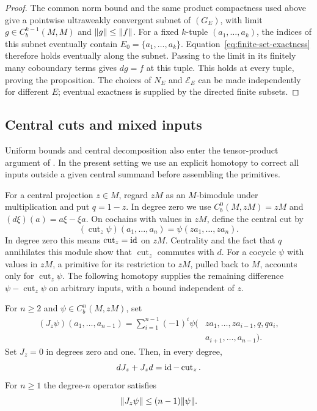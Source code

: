 \begin{proof}
The common norm bound and the same product compactness used above
give a pointwise ultraweakly convergent subnet of $(G_E)$, with limit
$g\in C_b^{k-1}(M,M)$ and $\lVert g\rVert\le\lVert f\rVert$.  For a fixed
$k$-tuple $(a_1,\ldots,a_k)$, the indices of this subnet eventually
contain $E_0=\{a_1,\ldots,a_k\}$.  Equation~\eqref{eq:finite-set-exactness}
therefore holds eventually along the subnet.  Passing to the limit
in its finitely many coboundary terms gives $dg=f$ at this tuple.
This holds at every tuple, proving the proposition.  The choices of
$N_E$ and $\mathcal E_E$ can be made independently for different
$E$; eventual exactness is supplied by the directed finite subsets.
\end{proof}

\subsection{Central cuts and mixed inputs}

Uniform bounds and central decomposition also enter the tensor-product
argument of \cite[Section~4]{PopSmith2010}. In the present setting we
use an explicit homotopy to correct all inputs outside a given central
summand before assembling the primitives.

For a central projection $z\in M$, regard $zM$ as an $M$-bimodule
under multiplication and put $q=1-z$.  In degree zero we use
$C_b^0(M,zM)=zM$ and $(d\xi)(a)=a\xi-\xi a$.
On cochains with values in
$zM$, define the central cut by
\[
 (\operatorname{cut}_z\psi)(a_1,\ldots,a_n)
 =\psi(za_1,\ldots,za_n).
\]
In degree zero this means $\operatorname{cut}_z=\operatorname{id}$ on $zM$.
Centrality and the fact that $q$ annihilates this module show that
$\operatorname{cut}_z$ commutes with $d$.
For a cocycle $\psi$ with values in $zM$, a primitive for its
restriction to $zM$, pulled back to $M$, accounts only for
$\operatorname{cut}_z\psi$.
The following homotopy supplies the remaining difference
$\psi-\operatorname{cut}_z\psi$ on arbitrary inputs, with a bound
independent of $z$.

\begin{lemma}\label{lem:central-homotopy}
For $n\ge2$ and $\psi\in C_b^n(M,zM)$, set
\begin{equation}\label{eq:central-homotopy-formula}
 \begin{split}
 (J_z\psi)(a_1,\ldots,a_{n-1})
 =\sum_{i=1}^{n-1}(-1)^i\psi(&za_1,\ldots,za_{i-1},
 q,qa_i,\\[-2pt]
 &a_{i+1},\ldots,a_{n-1}).
 \end{split}
\end{equation}
Set $J_z=0$ in degrees zero and one.  Then, in every degree,
\begin{equation}\label{eq:central-homotopy-identity}
 dJ_z+J_zd=\operatorname{id}-\operatorname{cut}_z.
\end{equation}
For $n\ge1$ the degree-$n$ operator satisfies
\begin{equation}\label{eq:central-homotopy-bound}
 \lVert J_z\psi\rVert\le(n-1)\lVert\psi\rVert.
\end{equation}
\end{lemma}

